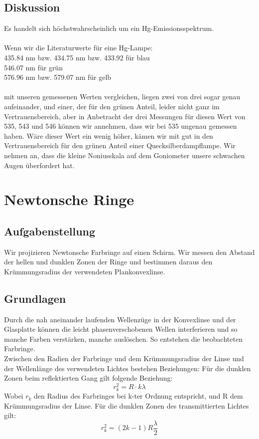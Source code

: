 \documentclass{article}
\begin{document}
\subsection{Diskussion}
Es handelt sich höchstwahrscheinlich um ein Hg-Emissionsspektrum.\\
\\
Wenn wir die 
Literaturwerte für eine Hg-Lampe:\\
435.84 nm bzw. 434.75 nm bzw. 433.92 für blau\\
546.07 nm für grün\\
576.96 nm bzw. 579.07 nm für gelb\\
\\
mit unseren gemessenen Werten vergleichen, liegen zwei von drei sogar genau aufeinander, und einer, der für den grünen Anteil, leider nicht ganz im Vertrauensbereich, aber in Anbetracht der drei Messungen für diesen Wert von 535, 543 und 546 können wir annehmen, dass wir bei 535 ungenau gemessen haben. Wäre dieser Wert ein wenig höher, kämen wir mit gut in den Vertrauensbereich für den grünen Anteil einer Quecksilberdampflampe. Wir nehmen an, dass die kleine Noniusskala auf dem Goniometer unsere schwachen Augen überfordert hat.


\section{Newtonsche Ringe}

\subsection{Aufgabenstellung}
Wir projizieren Newtonsche Farbringe auf einen Schirm. Wir messen den Abstand der hellen und dunklen Zonen der Ringe und bestimmen daraus den Krümmungsradius der verwendeten Plankonvexlinse.
\subsection{Grundlagen}
Durch die nah aneinander laufenden Wellenzüge in der Konvexlinse und der Glasplatte können die leicht phasenverschobenen Wellen interferieren und so manche Farben verstärken, manche auslöschen. So entstehen die beobachteten Farbringe. \\
Zwischen den Radien der Farbringe und dem Krümmungsradius der Linse und der Wellenlänge des verwendeten Lichtes bestehen Beziehungen:
Für die dunklen Zonen beim reflektierten Gang gilt folgende Beziehung:
\begin{equation}
\label{reflexionradius}
r_k^2=R\cdot k\lambda
\end{equation}
Wobei $r_k$ den Radius des Farbringes bei k-ter Ordnung entspricht, und R dem Krümmungsradius der Linse.
Für die dunklen Zonen des transmittierten Lichtes gilt:
\begin{equation}
\label{transradius}
r_k^2=(2k-1)R\frac{\lambda}{2}
\end{equation}
\end{document}
